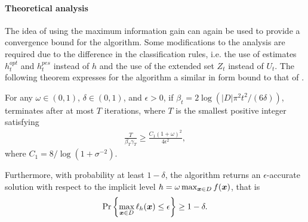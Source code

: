 \paragraph{Theoretical analysis}
The idea of using the maximum information gain can again be used to provide
a convergence bound for the \iacl algorithm. Some modifications to the analysis
are required due to the difference in the classification rules, i.e. the use
of estimates $h_t^{opt}$ and $h_t^{pes}$ instead of $h$ and the use of the
extended set $Z_t$ instead of $U_t$.
The following theorem expresses for the \iacl algorithm a similar in form bound
to that of .

\begin{theorem}
\label{thm:iacl}
For any $\omega \in (0, 1)$, $\delta \in (0, 1)$, and $\epsilon > 0$,
if $\beta_t = 2\log(|D|\pi^2 t^2/(6\delta))$, \iacl terminates after
at most $T$ iterations, where $T$ is the smallest positive integer
satisfying
\begin{align*}
\frac{T}{\beta_T \gamma_T} \geq \frac{C_1(1+\omega)^2}{4\epsilon^2},
\end{align*}
where $C_1 = 8/\log(1 + \sigma^{-2})$.

Furthermore, with probability at least $1-\delta$, the algorithm returns
an $\epsilon$-accurate solution with respect to the implicit level
$h = \omega \max_{\bm{x}\in D} f(\bm{x})$, that is
\begin{align*}
\Pr\left\{\max_{\bm{x}\in D}\ell_h(\bm{x}) \leq \epsilon\right\} \geq 1 - \delta.
\end{align*}
\end{theorem}

